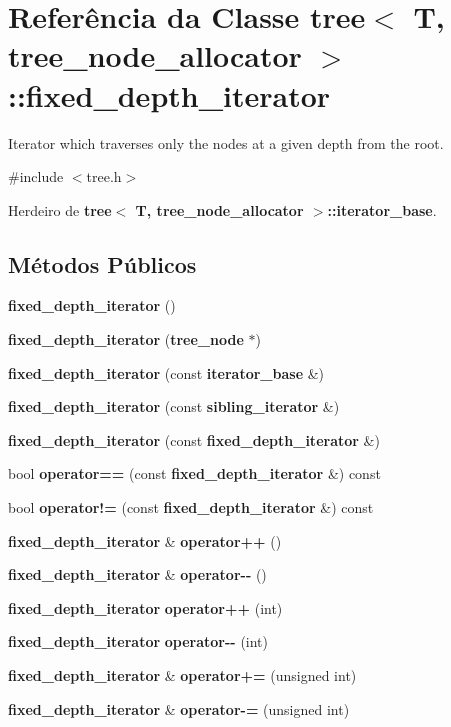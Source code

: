 \section{Referência da Classe tree$<$ T, tree\+\_\+node\+\_\+allocator $>$\+:\+:fixed\+\_\+depth\+\_\+iterator}
\label{classtree_1_1fixed__depth__iterator}


Iterator which traverses only the nodes at a given depth from the root.  




{\ttfamily \#include $<$tree.\+h$>$}



Herdeiro de {\bf tree$<$ T, tree\+\_\+node\+\_\+allocator $>$\+::iterator\+\_\+base}.

\subsection*{Métodos Públicos}
\begin{DoxyCompactItemize}
\item 
{\bf fixed\+\_\+depth\+\_\+iterator} ()
\item 
{\bf fixed\+\_\+depth\+\_\+iterator} ({\bf tree\+\_\+node} $\ast$)
\item 
{\bf fixed\+\_\+depth\+\_\+iterator} (const {\bf iterator\+\_\+base} \&)
\item 
{\bf fixed\+\_\+depth\+\_\+iterator} (const {\bf sibling\+\_\+iterator} \&)
\item 
{\bf fixed\+\_\+depth\+\_\+iterator} (const {\bf fixed\+\_\+depth\+\_\+iterator} \&)
\item 
bool {\bf operator==} (const {\bf fixed\+\_\+depth\+\_\+iterator} \&) const 
\item 
bool {\bf operator!=} (const {\bf fixed\+\_\+depth\+\_\+iterator} \&) const 
\item 
{\bf fixed\+\_\+depth\+\_\+iterator} \& {\bf operator++} ()
\item 
{\bf fixed\+\_\+depth\+\_\+iterator} \& {\bf operator-\/-\/} ()
\item 
{\bf fixed\+\_\+depth\+\_\+iterator} {\bf operator++} (int)
\item 
{\bf fixed\+\_\+depth\+\_\+iterator} {\bf operator-\/-\/} (int)
\item 
{\bf fixed\+\_\+depth\+\_\+iterator} \& {\bf operator+=} (unsigned int)
\item 
{\bf fixed\+\_\+depth\+\_\+iterator} \& {\bf operator-\/=} (unsigned int)
\end{DoxyCompactItemize}
